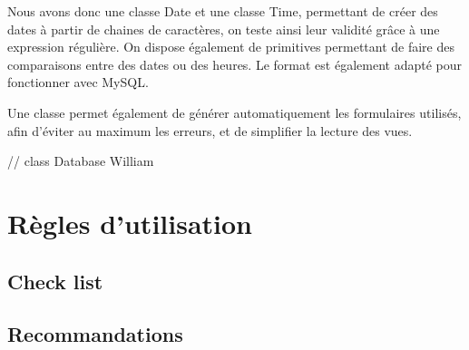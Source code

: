 Nous avons donc une classe Date et une classe Time, permettant de créer des dates à partir de chaines de caractères,
on teste ainsi leur validité grâce à une expression régulière. On dispose également de primitives permettant de
faire des comparaisons entre des dates ou des heures. Le format est également adapté pour fonctionner avec MySQL.

Une classe permet également de générer automatiquement les formulaires utilisés, afin d'éviter au maximum les erreurs,
et de simplifier la lecture des vues.

// class Database William

        \cite{ref_framework_mvc}

    \section{Règles d'utilisation}

        \subsection{Check list}



        \subsection{Recommandations}


